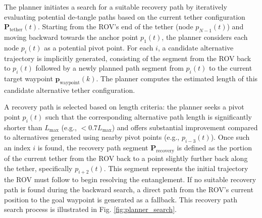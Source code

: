 The planner initiates a search for a suitable recovery path by iteratively evaluating potential de-tangle paths based on the current tether configuration \( \mathbf{P}_{\mathrm{tether}}(t) \). Starting from the \ac{ROV}'s end of the tether (node \( p_{N-1}(t) \)) and moving backward towards the anchor point \( p_1(t) \), the planner considers each node \( p_i(t) \) as a potential pivot point. For each \( i \), a candidate alternative trajectory is implicitly generated, consisting of the segment from the \ac{ROV} back to \( p_i(t) \) followed by a newly planned path segment from \( p_i(t) \) to the current target waypoint \( \mathbf{p}_{\text{waypoint}}(k) \). The planner computes the estimated length of this candidate alternative tether configuration.

A recovery path is selected based on length criteria: the planner seeks a pivot point \( p_i(t) \) such that the corresponding alternative path length is significantly shorter than \( L_{\text{max}} \) (e.g., \( < 0.7 L_{\text{max}} \)) and offers substantial improvement compared to alternatives generated using nearby pivot points (e.g., \( p_{i-3}(t) \)). Once such an index \( i \) is found, the recovery path segment \( \mathbf{P}_{\text{recovery}} \) is defined as the portion of the current tether from the \ac{ROV} back to a point slightly further back along the tether, specifically \( p_{i+2}(t) \). This segment represents the initial trajectory the \ac{ROV} must follow to begin resolving the entanglement. If no suitable recovery path is found during the backward search, a direct path from the \ac{ROV}'s current position to the goal waypoint is generated as a fallback. This recovery path search process is illustrated in Fig. \ref{fig:planner_search}.  








